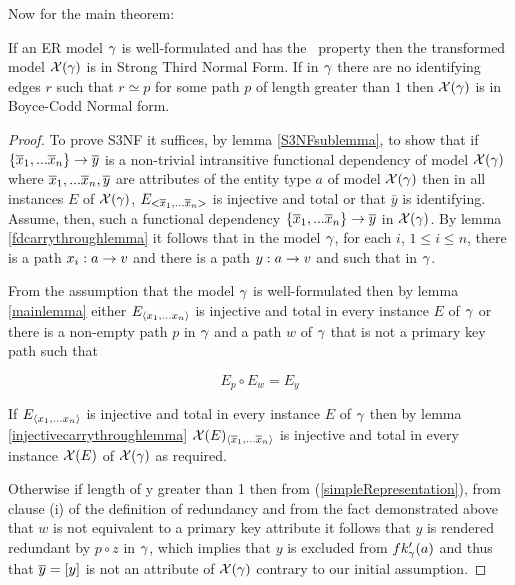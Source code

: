 \noindent Now for the main theorem:\\
\begin{theorem}
\noindent If an ER model $\gamma$ is well-formulated  and has the \fdfactoring\ property then the 
transformed model $\mathcal{X}(\gamma)$  is in Strong Third Normal Form. If in $\gamma$
there are no identifying edges $r$ such that $r \simeq p$ for some path $p$ of length greater than $1$
then $\mathcal{X}(\gamma)$ is in Boyce-Codd Normal form.
\end{theorem}
\begin{proof}
To prove S3NF it suffices, by lemma \ref{S3NFsublemma},  to show that if 
$\left\{\overline{x}_1,...\overline{x}_n\right\} \rightarrow \overline{y}$ is a non-trivial intransitive functional dependency of model $\mathcal{X}(\gamma)$
where $\overline{x}_1,...\overline{x}_n,\overline{y}$ are attributes of the entity type $a$ of model $\mathcal{X}(\gamma)$ 
then  in all instances
$E$ of $\mathcal{X}(\gamma)$, $E_{<\overline{x}_1,...\overline{x}_n>}$ is injective and total or that $\bar{y}$
is identifying. \\

\noindent Assume, then, such a functional dependency $\left\{\overline{x}_1,...\overline{x}_n\right\} \rightarrow \overline{y}$ in  $\mathcal{X}(\gamma)$. 
By lemma \ref{fdcarrythroughlemma} it follows that in the model $\gamma$, for each $i$, $1 \leq i \leq n$, there is a path
 $x_i : a \rightarrow v$  and there is  a path 
$y: a \rightarrow v$ and such that
  in $\gamma$.

From the assumption that the model $\gamma$ is well-formulated 
then by lemma \ref{mainlemma} 
either $E_{\langle x_1,...x_n \rangle}$ is
injective and total in every instance $E$ of $\gamma$
or there is a non-empty path $p$ in $\gamma$
and a path $w$ of $\gamma$ that is not a primary key path such that

\begin{equation}
\label{simpleRepresentation}
 E_p \circ E_w = E_y
\end{equation}


If $E_{\langle x_1,...x_n \rangle}$ is
injective and total in every instance $E$ of $\gamma$ then by 
lemma \ref{injectivecarrythroughlemma} $\mathcal{X}(E)_{\langle\overline{x}_1,...\overline{x}_n \rangle}$ is
injective and total in every instance $\mathcal{X}(E)$ of $\mathcal{X}(\gamma)$ as required.

Otherwise if length of y greater than 1 then 
 from  (\ref{simpleRepresentation}),
from clause (i) of the definition of redundancy and from the fact demonstrated above that $w$ is not equivalent to a 
primary key attribute
it follows that $y$ is rendered redundant by $p \circ z $ in $\gamma$, 
which implies that $y$ is excluded from $fk'_{\gamma}(a)$ and thus that 
 $\overline{y}=\left[y\right]$ is not an attribute of $\mathcal{X}(\gamma)$ contrary to our 
initial assumption. 


\end{proof}
